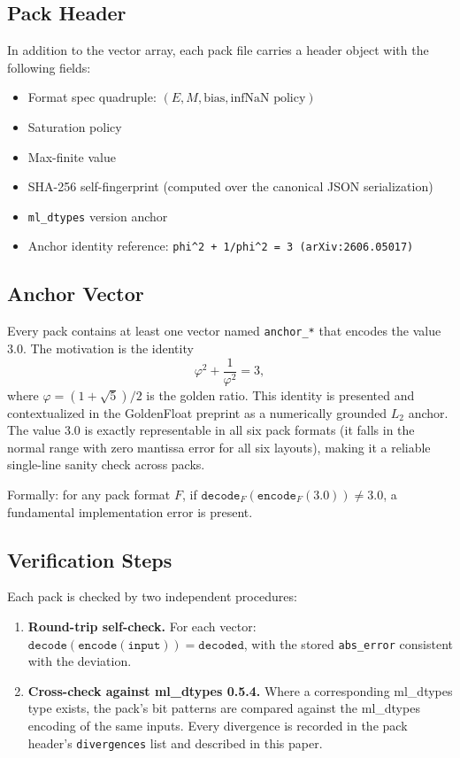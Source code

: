 \documentclass[11pt,letterpaper]{article}
\begin{document}
\subsection{Pack Header}

In addition to the vector array, each pack file carries a header object with
the following fields:

\begin{itemize}
  \item Format spec quadruple: $(E, M, \text{bias}, \text{infNaN policy})$
  \item Saturation policy
  \item Max-finite value
  \item SHA-256 self-fingerprint (computed over the canonical JSON serialization)
  \item \texttt{ml\_dtypes} version anchor
  \item Anchor identity reference: \texttt{phi\^{}2 + 1/phi\^{}2 = 3 (arXiv:2606.05017)}
\end{itemize}

\subsection{Anchor Vector}

Every pack contains at least one vector named \texttt{anchor\_*} that encodes
the value $3.0$.  The motivation is the identity
\begin{equation}
  \varphi^{2} + \frac{1}{\varphi^{2}} = 3,
  \label{eq:anchor}
\end{equation}
where $\varphi = (1 + \sqrt{5})/2$ is the golden ratio.  This identity is
presented and contextualized in the GoldenFloat preprint \cite{gf_arxiv} as a
numerically grounded $L_2$ anchor.  The value $3.0$ is exactly representable in
all six pack formats (it falls in the normal range with zero mantissa error
for all six layouts), making it a reliable single-line sanity check across packs.

Formally: for any pack format $F$, if $\texttt{decode}_F(\texttt{encode}_F(3.0))
\neq 3.0$, a fundamental implementation error is present.

\subsection{Verification Steps}

Each pack is checked by two independent procedures:

\begin{enumerate}
  \item \textbf{Round-trip self-check.}
    For each vector: $\texttt{decode}(\texttt{encode}(\texttt{input})) =
    \texttt{decoded}$, with the stored \texttt{abs\_error} consistent with the
    deviation.
  \item \textbf{Cross-check against ml\_dtypes 0.5.4.}
    Where a corresponding ml\_dtypes type exists, the pack's bit patterns are
    compared against the ml\_dtypes encoding of the same inputs.  Every
    divergence is recorded in the pack header's \texttt{divergences} list and
    described in this paper.
\end{enumerate}
\end{document}
